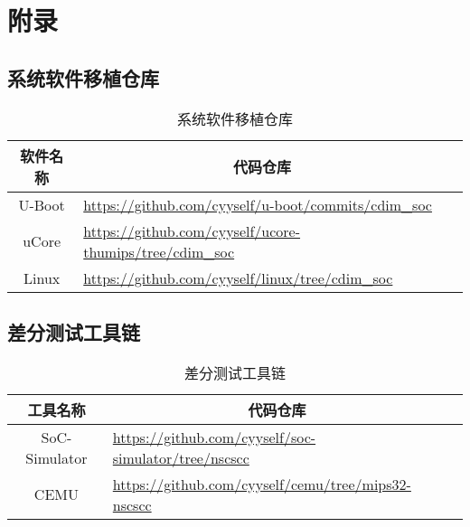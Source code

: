 \chapter{附录}

\section{系统软件移植仓库}

\begin{table}[!htbp]
    \centering
    \caption{系统软件移植仓库}
    
    \begin{tabular}{cll}
    \toprule
    \multicolumn{1}{c}{\textbf{软件名称}} & \multicolumn{1}{c}{\textbf{代码仓库}} \\ 
    \midrule
    U-Boot                             & \url{https://github.com/cyyself/u-boot/commits/cdim\_soc} \\
    uCore                              & \url{https://github.com/cyyself/ucore-thumips/tree/cdim\_soc} \\
    Linux                              & \url{https://github.com/cyyself/linux/tree/cdim\_soc} \\
    \bottomrule
    \end{tabular}
\end{table}

\section{差分测试工具链}

\begin{table}[!htbp]
    \centering
    \caption{差分测试工具链}
    
    \begin{tabular}{cll}
    \toprule
    \multicolumn{1}{c}{\textbf{工具名称}} & \multicolumn{1}{c}{\textbf{代码仓库}} \\ 
    \midrule
    SoC-Simulator                      & \url{https://github.com/cyyself/soc-simulator/tree/nscscc} \\
    CEMU                               & \url{https://github.com/cyyself/cemu/tree/mips32-nscscc} \\
    \bottomrule
    \end{tabular}
\end{table}